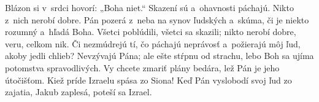 Blázon si v~srdci hovorí: „Boha niet.“
\versseparator
Skazení sú a~ohavnosti páchajú.
Nikto z~nich nerobí dobre.
\versseparator
Pán pozerá z~neba na synov ľudských
a~skúma, či je niekto rozumný a~hľadá Boha.
\versseparator
Všetci poblúdili, všetci sa skazili;
nikto nerobí dobre, veru, celkom nik.
\versseparator
Či nezmúdrejú tí, čo páchajú neprávosť
a~požierajú môj ľud, akoby jedli chlieb?
\versseparator
Nevzývajú Pána;
ale ešte stŕpnu od strachu,
\versseparator
lebo Boh sa ujíma potomstva spravodlivých.
Vy chcete zmariť plány bedára,
lež Pán je jeho útočišťom.
\versseparator
Kiež príde Izraelu spása zo Siona!
Keď Pán vyslobodí svoj ľud zo zajatia,
Jakub zaplesá, poteší sa Izrael.

